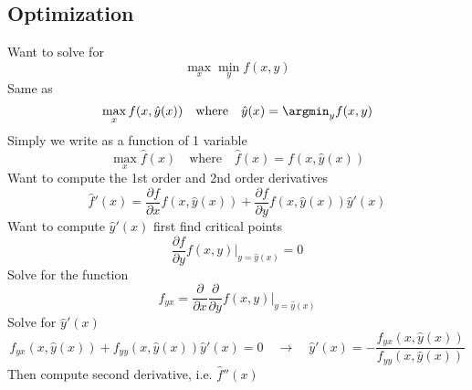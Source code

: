 \documentclass[11pt]{article}
\begin{document}
\newpage 
\subsection*{Optimization}

Want to solve for 
\[
    \max_x \min_y f(x, y)    
\]
Same as 
\[
    \max_x f(x, \hat{y}(x))
    \quad \text{where} \quad 
    \hat{y}(x) = \argmin_y f(x, y)
\]
Simply we write as a function of 1 variable
\[
    \max_x \hat{f}(x)    
    \quad \text{where}\quad 
    \hat{f}(x) = f(x, \hat{y}(x))
\]
Want to compute the 1st order and 2nd order derivatives
\[
    \hat{f}'(x) = \frac{\partial f}{\partial x} f(x, \hat{y}(x)) + \frac{\partial f}{\partial y} f(x, \hat{y}(x)) \hat{y}'(x)
\]
Want to compute $\hat{y}'(x)$ first find critical points
\[
    \frac{\partial f}{\partial y} f(x, y) |_{y=\hat{y}(x)} = 0
\]
Solve for the function
\[
    f_{yx} = \frac{\partial}{\partial x} \frac{\partial}{\partial y} f(x, y) |_{y=\hat{y}(x)}
\]
Solve for $\hat{y}'(x)$ 
\[
    f_{yx}(x, \hat{y}(x)) + f_{yy}(x, \hat{y}(x)) \hat{y}'(x) = 0
    \quad \rightarrow \quad 
    \hat{y}'(x) = - \frac{f_{yx}(x, \hat{y}(x))}{f_{yy}(x, \hat{y}(x))}
\]
Then compute second derivative, i.e.  $\hat{f}''(x)$ 
\end{document}
